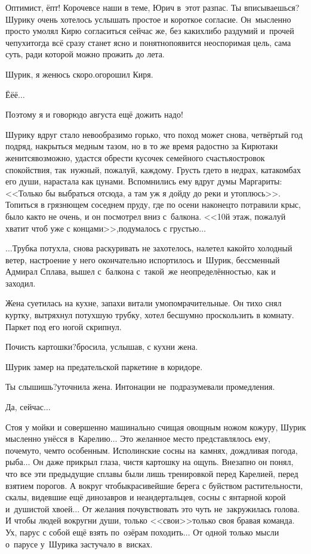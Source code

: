 {	\diagdash Оптимист, ёпт! Короче\mdash все наши в теме, Юрич в~этот раз\mdash пас. Ты вписываешься?\mdash Шурику очень хотелось услышать простое и короткое согласие. Он~мысленно просто умолял Кирю согласиться сейчас же, без каких\sdash либо раздумий и~прочей чепухи\mdash тогда всё сразу станет ясно и понятно\mdash появится неоспоримая цель, сама суть, ради которой можно прожить до лета.
	
	\diagdash Шурик, я женюсь скоро.\mdash огорошил Киря.
	
	\diagdash Ё\sdash ё\sdash ё$\ldots$
	
	\diagdash Поэтому я и говорю\mdash до августа ещё дожить надо!
	
	Шурику вдруг стало невообразимо горько, что поход может снова, четвёртый год подряд, накрыться медным тазом, но в то же время радостно за Кирю\mdash таки женится\mdash возможно, удастся обрести кусочек семейного счастья\mdash островок спокойствия, так~нужный, пожалуй, каждому. Грусть где\sdash то в недрах, катакомбах его души, нарастала как цунами. Вспомнились ему вдруг думы Маргариты: <<Только бы выбраться отсюда, а там уж я дойду до реки и утоплюсь>>\cite{МастерМаргарита}. Топиться в грязнющем соседнем пруду, где по осени наконец\sdash то потравили крыс, было как\sdash то не очень, и он посмотрел вниз с~балкона. <<10\sdash й этаж, пожалуй хватит чтоб уже с концами>>,\mdash подумалось с грустью$\ldots$
	
	$\ldots$Трубка потухла, снова раскуривать не захотелось, налетел какой\sdash то холодный ветер, настроение у него окончательно испортилось и~Шурик, бессменный Адмирал Сплава, вышел с~балкона с~такой~же неопределённостью, как и заходил.
	
	Жена суетилась на кухне, запахи витали умопомрачительные. Он тихо снял куртку, вытряхнул потухшую трубку, хотел бесшумно проскользить в комнату. Паркет под его ногой скрипнул. 
	
	\diagdash Почисть картошки?\mdash бросила, услышав, с кухни жена.
	
	Шурик замер на предательской паркетине в коридоре.
	
	\diagdash Ты слышишь?\mdash уточнила жена. Интонации не~подразумевали промедления.
	
	\diagdash Да, сейчас$\ldots$
	
	Стоя у мойки и совершенно машинально счищая овощным ножом кожуру, Шурик мысленно унёсся в~Карелию$\ldots$ Это желанное место представлялось ему, почему\sdash то, чем\sdash то особенным. Исполинские сосны на~камнях, дождливая погода, рыба$\ldots$ Он даже прикрыл глаза, чистя картошку на ощупь. Внезапно он понял, что все эти предыдущие сплавы были лишь тренировкой перед Карелией, перед взятием порогов. А вокруг чтобы\mdash красивейшие берега с буйством растительности, скалы, видевшие ещё динозавров и неандертальцев, сосны с янтарной корой и~душистой хвоей$\ldots$ От желания почувствовать это чуть не~закружилась голова. И чтобы людей вокруг\mdash ни души, только <<свои>>\mdash только своя бравая команда. Ух, парус с собой ещё взять по~озёрам походить$\ldots$ От одной только мысли о~парусе у~Шурика застучало в~висках.
	
}
